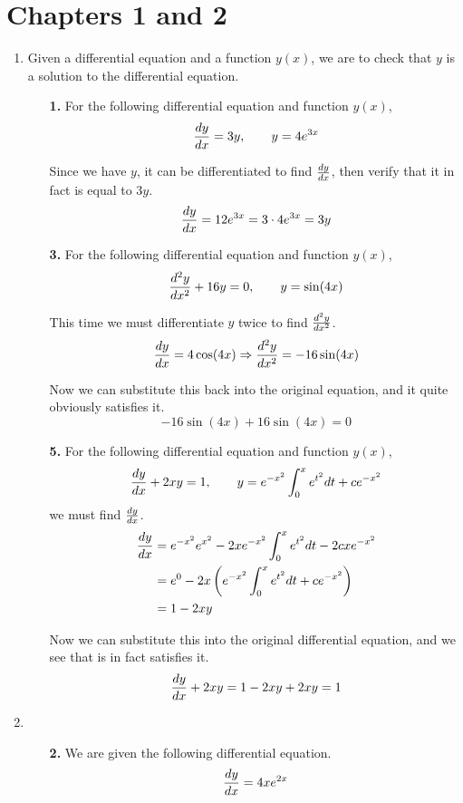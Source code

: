 \section{Chapters 1 and 2}

\begin{enumerate}[label=\textbf{\Alph*.}]
	\setlength{\itemsep}{\bigskipamount}
	\item
		Given a differential equation and a function \(y(x)\), we are to check that \(y\) is a solution to the differential equation.
		\begin{enumerate}
			\item[\textbf{1.}]
				For the following differential equation and function \(y(x)\),
				\[
					\frac{dy}{dx} = 3y, \qquad y = 4e^{3x}
				\]

				Since we have \(y\), it can be differentiated to find \(\frac{dy}{dx}\), then verify that it in fact is equal to \(3y\).
				\[
					\frac{dy}{dx} = 12e^{3x} = 3 \cdot 4e^{3x} = 3y
				\]

			\item[\textbf{3.}]
				For the following differential equation and function \(y(x)\),
				\[
					\frac{d^2y}{dx^2} + 16y = 0, \qquad y = \sin(4x)
				\]

				This time we must differentiate \(y\) twice to find \(\frac{d^2y}{dx^2}\).
				\[
					\frac{dy}{dx} = 4\cos(4x) \Rightarrow \frac{d^2y}{dx^2} = -16\sin(4x)
				\]

				Now we can substitute this back into the original equation, and it quite obviously satisfies it.
				\[
					-16\sin(4x) + 16\sin(4x) = 0
				\]

			\item[\textbf{5.}]
				For the following differential equation and function \(y(x)\),
				\[
					\frac{dy}{dx} + 2xy = 1, \qquad y = e^{-x^2} \int_0^x e^{t^2} dt + ce^{-x^2}
				\]
				we must find \(\frac{dy}{dx}\).
				\begin{align*}
					\frac{dy}{dx} & = e^{-x^2}e^{x^2} - 2xe^{-x^2} \int_0^x e^{t^2} dt - 2cxe^{-x^2} \\
					      & = e^0 - 2x \left(e^{-x^2} \int_0^x e^{t^2} dt + ce^{-x^2}\right) \\
					      & = 1 - 2xy
				\end{align*}

				Now we can substitute this into the original differential equation, and we see that is in fact satisfies it.
				\[
					\frac{dy}{dx} + 2xy = 1 - 2xy + 2xy = 1
				\]

		\end{enumerate}

	\item
		\begin{enumerate}
			\item[\textbf{2.}]
				We are given the following differential equation.
				\[
					\frac{dy}{dx} = 4xe^{2x}
				\]


\end{enumerate}
\end{enumerate}
